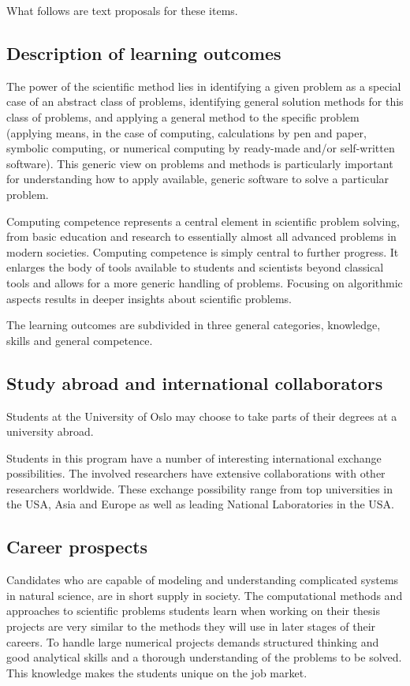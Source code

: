 \documentclass[%
oneside,                 %
final,                   %
10pt]{article}
\begin{document}
\noindent
What follows are text proposals for these items.

\subsection{Description of learning outcomes}

The power of the scientific method lies in identifying a given problem
as a special case of an abstract class of problems, identifying
general solution methods for this class of problems, and applying a
general method to the specific problem (applying means, in the case of
computing, calculations by pen and paper, symbolic computing, or
numerical computing by ready-made and/or self-written software). This
generic view on problems and methods is particularly important for
understanding how to apply available, generic software to solve a
particular problem.

Computing competence represents a central element
in scientific problem solving, from basic education and research to
essentially almost all advanced problems in modern
societies. Computing competence is simply central to further
progress. It enlarges the body of tools available to students and
scientists beyond classical tools and allows for a more generic
handling of problems. Focusing on algorithmic aspects results in
deeper insights about scientific problems.

The learning outcomes are subdivided in three general categories, knowledge, skills and general competence.

\subsection{Study abroad and international collaborators}

Students at the University of Oslo may choose to take parts of
their degrees at a university abroad.

Students in this program have a number of interesting international
exchange possibilities. The involved researchers have extensive
collaborations with other researchers worldwide. These exchange
possibility range from top universities in the USA, Asia and Europe as
well as leading National Laboratories in the USA.

\subsection{Career prospects}

Candidates who are capable of modeling and understanding complicated
systems in natural science, are in short supply in society.  The
computational methods and approaches to scientific problems students learn
when working on their thesis projects are very similar to the methods
they will use in later stages of their careers.  To handle large
numerical projects demands structured thinking and good analytical
skills and a thorough understanding of the problems to be solved. This
knowledge makes the students unique on the job market.
\end{document}
